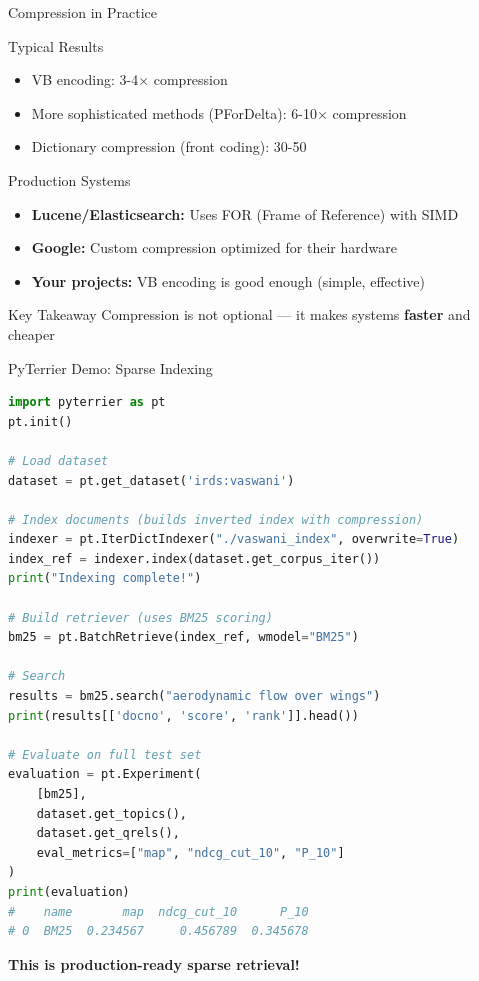 \documentclass[aspectratio=169]{beamer}
\newif\ifanimated
\newcommand{\cpause}{\ifanimated\pause\fi}
\begin{document}
\begin{frame}[shrink=5]{Compression in Practice}
\begin{block}{Typical Results}
\begin{itemize}
    \item VB encoding: 3-4$\times$ compression
    \item More sophisticated methods (PForDelta): 6-10$\times$ compression
    \item Dictionary compression (front coding): 30-50%
\end{itemize}
\end{block}
\cpause

\vspace{1em}

\begin{exampleblock}{Production Systems}
\begin{itemize}
    \item \textbf{Lucene/Elasticsearch:} Uses FOR (Frame of Reference) with SIMD
    \item \textbf{Google:} Custom compression optimized for their hardware
    \item \textbf{Your projects:} VB encoding is good enough (simple, effective)
\end{itemize}
\end{exampleblock}
\cpause

\vspace{1em}

\begin{alertblock}{Key Takeaway}
Compression is not optional --- it makes systems \textbf{faster} and cheaper
\end{alertblock}
\cpause
\end{frame}

\begin{frame}[fragile,shrink=5]{PyTerrier Demo: Sparse Indexing}
\begin{lstlisting}[language=Python, basicstyle=\ttfamily\tiny]
import pyterrier as pt
pt.init()

# Load dataset
dataset = pt.get_dataset('irds:vaswani')

# Index documents (builds inverted index with compression)
indexer = pt.IterDictIndexer("./vaswani_index", overwrite=True)
index_ref = indexer.index(dataset.get_corpus_iter())
print("Indexing complete!")

# Build retriever (uses BM25 scoring)
bm25 = pt.BatchRetrieve(index_ref, wmodel="BM25")

# Search
results = bm25.search("aerodynamic flow over wings")
print(results[['docno', 'score', 'rank']].head())

# Evaluate on full test set
evaluation = pt.Experiment(
    [bm25],
    dataset.get_topics(),
    dataset.get_qrels(),
    eval_metrics=["map", "ndcg_cut_10", "P_10"]
)
print(evaluation)
#    name       map  ndcg_cut_10      P_10
# 0  BM25  0.234567     0.456789  0.345678
\end{lstlisting}

\textbf{This is production-ready sparse retrieval!}
\end{frame}
\end{document}
